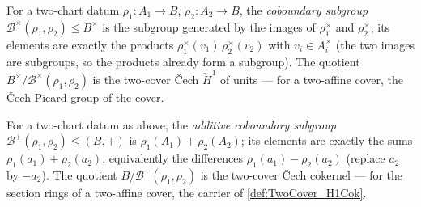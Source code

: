 \begin{definition}
  \label{def:cech_coboundary_units}
  \leanok
  For a two-chart datum \(\rho_1 : A_1 \to B\), \(\rho_2 : A_2 \to B\), the
  \emph{coboundary subgroup} \(\mathcal B^\times(\rho_1, \rho_2) \leq B^\times\) is the
  subgroup generated by the images of \(\rho_1^\times\) and \(\rho_2^\times\); its
  elements are exactly the products \(\rho_1^\times(v_1)\,\rho_2^\times(v_2)\) with
  \(v_i \in A_i^\times\) (the two images are subgroups, so the products already form a
  subgroup). The quotient \(B^\times / \mathcal B^\times(\rho_1, \rho_2)\) is the
  two-cover \v{C}ech \(\check H^1\) of units --- for a two-affine cover, the \v{C}ech
  Picard group of the cover.
\end{definition}

\begin{definition}
  \label{def:cech_coboundary_add}
  \leanok
  For a two-chart datum as above, the \emph{additive coboundary subgroup}
  \(\mathcal B^+(\rho_1, \rho_2) \leq (B, +)\) is
  \(\rho_1(A_1) + \rho_2(A_2)\); its elements are exactly the sums
  \(\rho_1(a_1) + \rho_2(a_2)\), equivalently the differences
  \(\rho_1(a_1) - \rho_2(a_2)\) (replace \(a_2\) by \(-a_2\)). The quotient
  \(B / \mathcal B^+(\rho_1, \rho_2)\) is the two-cover \v{C}ech cokernel --- for the
  section rings of a two-affine cover, the carrier of \ref{def:TwoCover_H1Cok}.
\end{definition}

